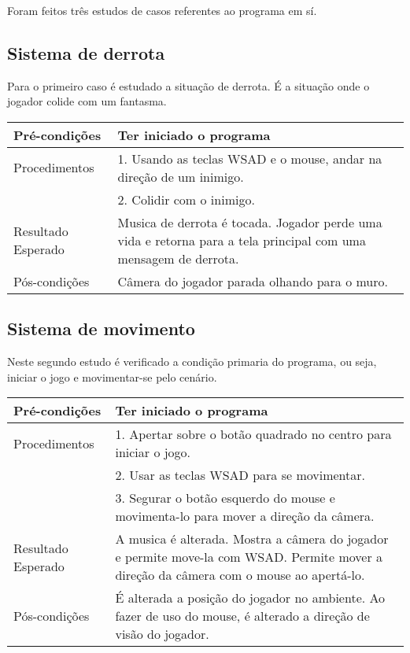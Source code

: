 


Foram feitos três estudos de casos referentes ao programa em sí.

\subsection{Sistema de derrota}\label{label}

Para o primeiro caso é estudado a situação de derrota. É a situação onde o jogador colide com um fantasma.\\
	
\begin{tabular}{>{\centering}p{3.5cm}<{\centering}p{3.5cm}}
\hline
Pré-condições  & Ter iniciado o programa
\tabularnewline
\hline
Procedimentos 
& 1. Usando as teclas WSAD e o mouse, andar na direção de um inimigo.\tabularnewline
& 2. Colidir com o inimigo.
\tabularnewline\hline
Resultado Esperado & Musica de derrota é tocada. Jogador perde uma vida e retorna para a tela principal com uma mensagem de derrota.
\tabularnewline\hline
Pós-condições & Câmera do jogador parada olhando para o muro.
\end{tabular}

\subsection{Sistema de movimento}\label{mov}

Neste segundo estudo é verificado a condição primaria do programa, ou seja, iniciar o jogo e movimentar-se pelo cenário.\\

\begin{tabular}{>{\centering}p{3.5cm}<{\centering}p{3.5cm}}
\hline
Pré-condições  & Ter iniciado o programa
\tabularnewline
\hline
Procedimentos
& 1. Apertar sobre o botão quadrado no centro para iniciar o jogo.\tabularnewline 
& 2. Usar as teclas WSAD para se movimentar.\tabularnewline
& 3. Segurar o botão esquerdo do mouse e movimenta-lo para mover a direção da câmera.
\tabularnewline\hline
Resultado Esperado 
& A musica é alterada. Mostra a câmera do jogador e permite move-la com WSAD.  Permite mover a direção da câmera com o  mouse ao apertá-lo. 
\tabularnewline\hline
Pós-condições & É alterada a posição do jogador no ambiente. Ao fazer de uso do mouse, é alterado a direção de visão do jogador.
\end{tabular}

